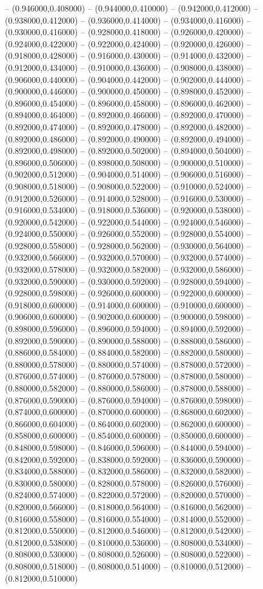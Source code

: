 -- (0.946000,0.408000) -- (0.944000,0.410000) -- (0.942000,0.412000) -- (0.938000,0.412000) -- (0.936000,0.414000) -- (0.934000,0.416000) -- (0.930000,0.416000) -- (0.928000,0.418000) -- (0.926000,0.420000) -- (0.924000,0.422000) -- (0.922000,0.424000) -- (0.920000,0.426000) -- (0.918000,0.428000) -- (0.916000,0.430000) -- (0.914000,0.432000) -- (0.912000,0.434000) -- (0.910000,0.436000) -- (0.908000,0.438000) -- (0.906000,0.440000) -- (0.904000,0.442000) -- (0.902000,0.444000) -- (0.900000,0.446000) -- (0.900000,0.450000) -- (0.898000,0.452000) -- (0.896000,0.454000) -- (0.896000,0.458000) -- (0.896000,0.462000) -- (0.894000,0.464000) -- (0.892000,0.466000) -- (0.892000,0.470000) -- (0.892000,0.474000) -- (0.892000,0.478000) -- (0.892000,0.482000) -- (0.892000,0.486000) -- (0.892000,0.490000) -- (0.892000,0.494000) -- (0.892000,0.498000) -- (0.892000,0.502000) -- (0.894000,0.504000) -- (0.896000,0.506000) -- (0.898000,0.508000) -- (0.900000,0.510000) -- (0.902000,0.512000) -- (0.904000,0.514000) -- (0.906000,0.516000) -- (0.908000,0.518000) -- (0.908000,0.522000) -- (0.910000,0.524000) -- (0.912000,0.526000) -- (0.914000,0.528000) -- (0.916000,0.530000) -- (0.916000,0.534000) -- (0.918000,0.536000) -- (0.920000,0.538000) -- (0.920000,0.542000) -- (0.922000,0.544000) -- (0.924000,0.546000) -- (0.924000,0.550000) -- (0.926000,0.552000) -- (0.928000,0.554000) -- (0.928000,0.558000) -- (0.928000,0.562000) -- (0.930000,0.564000) -- (0.932000,0.566000) -- (0.932000,0.570000) -- (0.932000,0.574000) -- (0.932000,0.578000) -- (0.932000,0.582000) -- (0.932000,0.586000) -- (0.932000,0.590000) -- (0.930000,0.592000) -- (0.928000,0.594000) -- (0.928000,0.598000) -- (0.926000,0.600000) -- (0.922000,0.600000) -- (0.918000,0.600000) -- (0.914000,0.600000) -- (0.910000,0.600000) -- (0.906000,0.600000) -- (0.902000,0.600000) -- (0.900000,0.598000) -- (0.898000,0.596000) -- (0.896000,0.594000) -- (0.894000,0.592000) -- (0.892000,0.590000) -- (0.890000,0.588000) -- (0.888000,0.586000) -- (0.886000,0.584000) -- (0.884000,0.582000) -- (0.882000,0.580000) -- (0.880000,0.578000) -- (0.880000,0.574000) -- (0.878000,0.572000) -- (0.876000,0.574000) -- (0.876000,0.578000) -- (0.878000,0.580000) -- (0.880000,0.582000) -- (0.880000,0.586000) -- (0.878000,0.588000) -- (0.876000,0.590000) -- (0.876000,0.594000) -- (0.876000,0.598000) -- (0.874000,0.600000) -- (0.870000,0.600000) -- (0.868000,0.602000) -- (0.866000,0.604000) -- (0.864000,0.602000) -- (0.862000,0.600000) -- (0.858000,0.600000) -- (0.854000,0.600000) -- (0.850000,0.600000) -- (0.848000,0.598000) -- (0.846000,0.596000) -- (0.844000,0.594000) -- (0.842000,0.592000) -- (0.838000,0.592000) -- (0.836000,0.590000) -- (0.834000,0.588000) -- (0.832000,0.586000) -- (0.832000,0.582000) -- (0.830000,0.580000) -- (0.828000,0.578000) -- (0.826000,0.576000) -- (0.824000,0.574000) -- (0.822000,0.572000) -- (0.820000,0.570000) -- (0.820000,0.566000) -- (0.818000,0.564000) -- (0.816000,0.562000) -- (0.816000,0.558000) -- (0.816000,0.554000) -- (0.814000,0.552000) -- (0.812000,0.550000) -- (0.812000,0.546000) -- (0.812000,0.542000) -- (0.812000,0.538000) -- (0.810000,0.536000) -- (0.808000,0.534000) -- (0.808000,0.530000) -- (0.808000,0.526000) -- (0.808000,0.522000) -- (0.808000,0.518000) -- (0.808000,0.514000) -- (0.810000,0.512000) -- (0.812000,0.510000) 